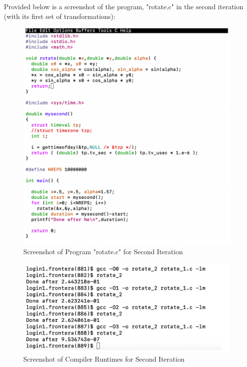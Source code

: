 \documentclass{article}
\begin{document}
Provided below is a screenshot of the program, "rotate.c" in the second iteration (with its first set of transformations):


\begin{figure}[ht]
    \centering
\includegraphics[scale=0.20]{graphics_hw4/rotate_c_second_iteration.png}
    \caption{Screenshot of Program "rotate.c" for Second Iteration}
    \label{fig:my_label}
\end{figure}
\pagebreak



\begin{figure}[!h]
    \centering
\includegraphics[scale=0.20]{graphics_hw4/compilation_runtimes_second_iteration.png}
    \caption{Screenshot of Compiler Runtimes for Second Iteration}
    \label{fig:my_label}
\end{figure}
\pagebreak
\end{document}
